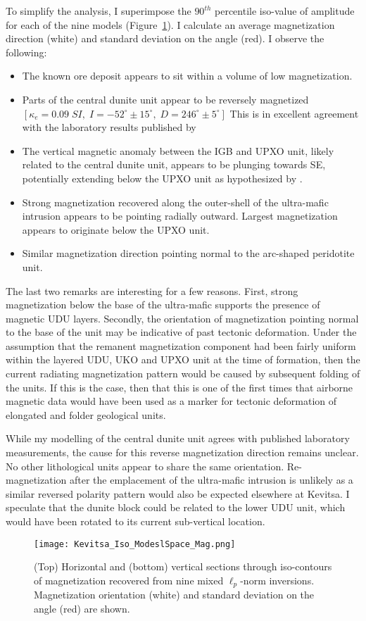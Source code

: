 To simplify the analysis, I superimpose the $90^{th}$ percentile iso-value of amplitude for each of the nine models (Figure~\ref{MVIS_Iso_model}). I calculate an average magnetization direction (white) and standard deviation on the angle (red). I observe the following:
\begin{itemize}
\item The known ore deposit appears to sit within a volume of low magnetization.
\item Parts of the central dunite unit appear to be reversely magnetized $[\kappa_{e} = 0.09\;SI, \;I=-52^\circ \pm 15^\circ, \;D=246^\circ \pm 5^\circ]$ This is in excellent agreement with the laboratory results published by \cite{Montonen2012}
\item The vertical magnetic anomaly between the IGB and UPXO unit, likely related to the central dunite unit, appears to be plunging towards SE, potentially extending below the UPXO unit as hypothesized by \cite{Koivisto2015}.
\item Strong magnetization recovered along the outer-shell of the ultra-mafic intrusion appears to be pointing radially outward. Largest magnetization appears to originate below the UPXO unit.
\item Similar magnetization direction pointing normal to the arc-shaped peridotite unit.
\end{itemize}

The last two remarks are interesting for a few reasons. First, strong magnetization below the base of the ultra-mafic supports the presence of magnetic UDU layers.
Secondly, the orientation of magnetization pointing normal to the base of the unit may be indicative of past tectonic deformation.
Under the assumption that the remanent magnetization component had been fairly uniform within the layered UDU, UKO and UPXO unit at the time of formation, then the current radiating magnetization pattern would be caused by subsequent folding of the units.
If this is the case, then that this is one of the first times that airborne magnetic data would have been used as a marker for tectonic deformation of elongated and folder geological units.

While my modelling of the central dunite unit agrees with published laboratory measurements, the cause for this reverse magnetization direction remains unclear. No other lithological units appear to share the same orientation. Re-magnetization after the emplacement of the ultra-mafic intrusion is unlikely as a similar reversed polarity pattern would also be expected elsewhere at Kevitsa. I speculate that the dunite block could be related to the lower UDU unit, which would have been rotated to its current sub-vertical location.
\begin{figure}[h!]
\texttt{[image: Kevitsa\_Iso\_ModeslSpace\_Mag.png]}
\caption{(Top) Horizontal and (bottom) vertical sections through iso-contours of magnetization recovered from nine mixed $\ell_p$-norm inversions. Magnetization orientation (white) and standard deviation on the angle (red) are shown.}
\label{MVIS_Iso_model}
\end{figure}


